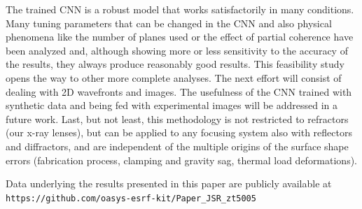 \documentclass[preprint]{iucr}
\newcommand{\inred}[1]{{\color{red}#1}}
\begin{document}
The trained CNN is a robust model that works satisfactorily in many conditions. Many tuning parameters that can be changed in the CNN and also physical phenomena like the number of planes used or the effect of partial coherence have been analyzed and, although showing more or less sensitivity to the accuracy of the results, they always produce reasonably good results. This feasibility study opens the way to other more complete analyses. The next effort will consist of dealing with 2D wavefronts and images.  
The usefulness of the CNN trained with synthetic data and being fed with  experimental images will be addressed in a future work.
\inred{Last, but not least, this methodology is not restricted to refractors (our x-ray lenses), but can be applied to any focusing system also with reflectors and diffractors, and are independent of the multiple origins of the surface shape errors (fabrication process, clamping and gravity sag, thermal load deformations). }








Data underlying the results presented in this paper are publicly available at \newline
\small{\texttt{https://github.com/oasys-esrf-kit/Paper\_JSR\_zt5005}}


\end{document}
